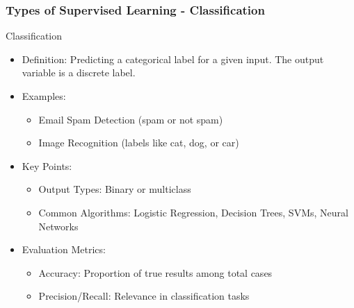 \documentclass[aspectratio=169]{beamer}
\begin{document}
\begin{frame}[fragile]
    \frametitle{Types of Supervised Learning - Classification}
    \begin{block}{Classification}
        \begin{itemize}
            \item Definition: Predicting a categorical label for a given input. The output variable is a discrete label.
            \item Examples:
                \begin{itemize}
                    \item Email Spam Detection (spam or not spam)
                    \item Image Recognition (labels like cat, dog, or car)
                \end{itemize}
        \end{itemize}        
    \end{block}
    
    \begin{itemize}
        \item Key Points:
            \begin{itemize}
                \item Output Types: Binary or multiclass
                \item Common Algorithms: Logistic Regression, Decision Trees, SVMs, Neural Networks
            \end{itemize}
        \item Evaluation Metrics:
            \begin{itemize}
                \item Accuracy: Proportion of true results among total cases
                \item Precision/Recall: Relevance in classification tasks
            \end{itemize}
    \end{itemize}
\end{frame}
\end{document}

